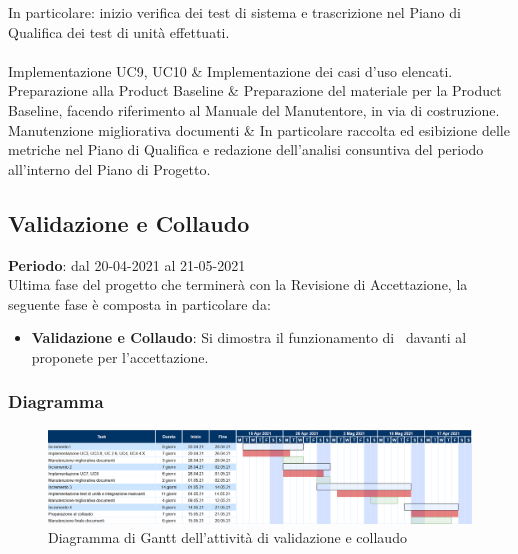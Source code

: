 \begin{longtabu}
						In particolare: inizio verifica dei test di sistema e trascrizione nel Piano di Qualifica dei test di unità effettuati. \\
					\hline
					 \\
					\hline
						Implementazione UC9, UC10 & 
						Implementazione dei casi d'uso elencati.\\
					\hline
						Preparazione alla Product Baseline & 
						Preparazione del materiale per la Product Baseline, facendo riferimento al Manuale del Manutentore, in via di costruzione.\\
					\hline
						Manutenzione migliorativa documenti & 
						In particolare raccolta ed esibizione delle metriche nel Piano di Qualifica e redazione dell'analisi consuntiva del periodo all'interno del Piano di Progetto. \\
					\hline
    		\end{longtabu}

	\subsection{Validazione e Collaudo}
	\textbf{Periodo}: dal 20-04-2021 al 21-05-2021 \\
	Ultima fase del progetto che terminerà con la Revisione di Accettazione, la seguente fase è composta in particolare da:
	\begin{itemize}
		\item \textbf{Validazione e Collaudo}: Si dimostra il funzionamento di \hd\ davanti al proponete per l'accettazione.
	\end{itemize}
	
	\subsubsection{Diagramma}
		\begin{figure}[H]
        		\centering
        		\includegraphics[width=\textwidth]{source/img/Validazione_collaudo.png}
        		\caption{Diagramma di Gantt dell'attività di validazione e collaudo}
    		\end{figure}
